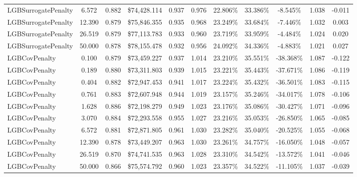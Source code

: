 \documentclass{article}
\theoremstyle{plain}
\theoremstyle{definition}
\newcommand{\1}{\mathbf{1}}
\begin{document}
\begin{table}[!htbp]
{\begin{tabular}{lc|cc|cc|cc|ccc}
LGBSurrogatePenalty & 6.572 & 0.882 & \$74{,}428.114 & 0.937 & 0.976 & 22.806\% & 33.386\% & -8.545\% & 1.038 & -0.011 \\
LGBSurrogatePenalty & 12.390 & 0.879 & \$75{,}846.355 & 0.935 & 0.968 & 23.249\% & 33.684\% & -7.446\% & 1.032 & 0.003 \\
LGBSurrogatePenalty & 26.519 & 0.879 & \$77{,}113.783 & 0.933 & 0.960 & 23.719\% & 33.959\% & -4.484\% & 1.024 & 0.020 \\
LGBSurrogatePenalty & 50.000 & 0.878 & \$78{,}155.478 & 0.932 & 0.956 & 24.092\% & 34.336\% & -4.883\% & 1.021 & 0.027 \\
\midrule
LGBCovPenalty & 0.100 & 0.879 & \$73{,}459.227 & 0.937 & 1.014 & 23.210\% & 35.551\% & -38.368\% & 1.087 & -0.122 \\
LGBCovPenalty & 0.189 & 0.880 & \$73{,}311.803 & 0.939 & 1.015 & 23.221\% & 35.443\% & -37.671\% & 1.086 & -0.119 \\
LGBCovPenalty & 0.404 & 0.882 & \$72{,}947.453 & 0.941 & 1.017 & 23.224\% & 35.432\% & -36.501\% & 1.083 & -0.115 \\
LGBCovPenalty & 0.761 & 0.883 & \$72{,}607.948 & 0.944 & 1.019 & 23.157\% & 35.246\% & -34.017\% & 1.078 & -0.106 \\
LGBCovPenalty & 1.628 & 0.886 & \$72{,}198.279 & 0.949 & 1.023 & 23.176\% & 35.086\% & -30.427\% & 1.071 & -0.096 \\
LGBCovPenalty & 3.070 & 0.884 & \$72{,}293.558 & 0.955 & 1.027 & 23.216\% & 35.053\% & -26.850\% & 1.065 & -0.085 \\
LGBCovPenalty & 6.572 & 0.881 & \$72{,}871.805 & 0.961 & 1.030 & 23.282\% & 35.040\% & -20.525\% & 1.055 & -0.068 \\
LGBCovPenalty & 12.390 & 0.878 & \$73{,}449.207 & 0.963 & 1.030 & 23.261\% & 34.757\% & -16.050\% & 1.048 & -0.057 \\
LGBCovPenalty & 26.519 & 0.870 & \$74{,}741.535 & 0.963 & 1.028 & 23.310\% & 34.542\% & -13.572\% & 1.041 & -0.046 \\
LGBCovPenalty & 50.000 & 0.866 & \$75{,}574.792 & 0.960 & 1.023 & 23.357\% & 34.522\% & -11.105\% & 1.037 & -0.039 \\
\bottomrule
\end{tabular}}
\end{table}
\end{document}
